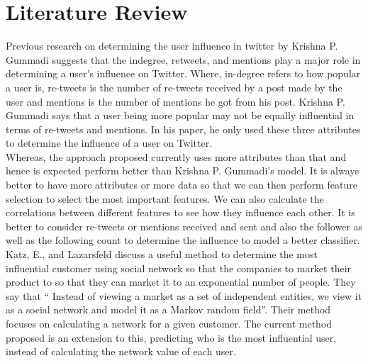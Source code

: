 \documentclass[sigconf]{acmart}
\begin{document}
\section{Literature Review}
Previous research on determining the user influence in twitter by Krishna P. Gummadi suggests that the indegree, retweets, and mentions play a major role in determining a user’s influence on Twitter. Where, in-degree refers to how popular a user is, re-tweets is the number of re-tweets received by a post made by the user and mentions is the number of mentions he got from his post. Krishna P. Gummadi says that a user being more popular may not be equally influential in terms of re-tweets and mentions. In his paper, he only used these three attributes to determine the influence of a user on Twitter.\cite{M2010}\\
Whereas, the approach proposed currently uses more attributes than that and hence is expected perform better than Krishna P. Gummadi’s model.  It is always better to have more attributes or more data so that we can then perform feature selection to select the most important features. We can also calculate the correlations between different features to see how they influence each other. It is better to consider re-tweets or mentions received and sent and also the follower as well as the following count to determine the influence to model a better classifier.\cite{M2010}\\
Katz, E., and Lazarsfeld discuss a useful method to determine the most influential customer using social network so that the companies to market their product to so that they can market it to an exponential number of people. They say that “ Instead of viewing a market as a set of independent entities, we view it as a social network and model it as a Markov random field”.  Their method focuses on calculating a network for a given customer. The current method proposed is an extension to this, predicting who is the most influential user, instead of calculating the network value of each user.\cite{Katz1955}\\
\end{document}
